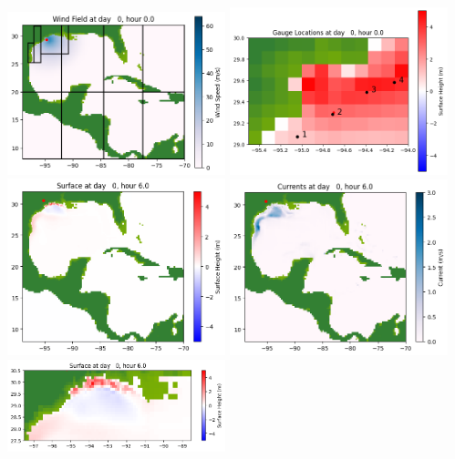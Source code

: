 \documentclass[11pt]{article}
\begin{document}
\vskip 10pt 
\includegraphics[width=0.475\textwidth]{frame0012fig1007.png}
\includegraphics[width=0.475\textwidth]{frame0012fig1008.png}
\vskip 10pt 
\includegraphics[width=0.475\textwidth]{frame0013fig1001.png}
\includegraphics[width=0.475\textwidth]{frame0013fig1002.png}
\vskip 10pt 
\includegraphics[width=0.475\textwidth]{frame0013fig1003.png}
\end{document}
